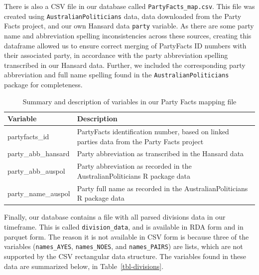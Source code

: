\documentclass[
  letterpaper,
  DIV=11,
  numbers=noendperiod]{scrartcl}
\begin{document}
There is also a CSV file in our database called
\texttt{PartyFacts\_map.csv}. This file was created using
\texttt{AustralianPoliticians} data, data downloaded from the Party
Facts project, and our own Hansard data \texttt{party} variable. As
there are some party name and abbreviation spelling inconsistencies
across these sources, creating this dataframe allowed us to ensure
correct merging of PartyFacts ID numbers with their associated party, in
accordance with the party abbreviation spelling transcribed in our
Hansard data. Further, we included the corresponding party abbreviation
and full name spelling found in the \texttt{AustralianPoliticians}
package for completeness.

\hypertarget{tbl-partyfacts-vars}{}
\begin{table}[H]
\caption{\label{tbl-partyfacts-vars}Summary and description of variables in our Party Facts mapping file }\tabularnewline

\centering
\begin{tabular}{>{\raggedright\arraybackslash}p{10em}>{\raggedright\arraybackslash}p{25em}}
\toprule
Variable & Description\\
\midrule
partyfacts\_id & PartyFacts identification number, based on linked parties data from the Party Facts project\\
party\_abb\_hansard & Party abbreviation as transcribed in the Hansard data\\
party\_abb\_auspol & Party abbreviation as recorded in the AustralianPoliticians R package data\\
party\_name\_auspol & Party full name as recorded in the AustralianPoliticians R package data\\
\bottomrule
\end{tabular}
\end{table}

Finally, our database contains a file with all parsed divisions data in
our timeframe. This is called \texttt{division\_data}, and is available
in RDA form and in parquet form. The reason it is not available in CSV
form is because three of the variables (\texttt{names\_AYES},
\texttt{names\_NOES}, and \texttt{names\_PAIRS}) are lists, which are
not supported by the CSV rectangular data structure. The variables found
in these data are summarized below, in Table~\ref{tbl-divisions}.
\end{document}
